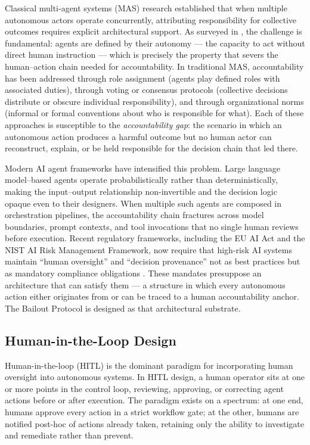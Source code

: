Classical multi-agent systems (MAS) research established that when multiple autonomous actors operate concurrently, attributing responsibility for collective outcomes requires explicit architectural support. As surveyed in \cite{trist1981}, the challenge is fundamental: agents are defined by their autonomy --- the capacity to act without direct human instruction --- which is precisely the property that severs the human--action chain needed for accountability. In traditional MAS, accountability has been addressed through role assignment (agents play defined roles with associated duties), through voting or consensus protocols (collective decisions distribute or obscure individual responsibility), and through organizational norms (informal or formal conventions about who is responsible for what). Each of these approaches is susceptible to the \textit{accountability gap}: the scenario in which an autonomous action produces a harmful outcome but no human actor can reconstruct, explain, or be held responsible for the decision chain that led there.

Modern AI agent frameworks have intensified this problem. Large language model--based agents operate probabilistically rather than deterministically, making the input--output relationship non-invertible and the decision logic opaque even to their designers. When multiple such agents are composed in orchestration pipelines, the accountability chain fractures across model boundaries, prompt contexts, and tool invocations that no single human reviews before execution. Recent regulatory frameworks, including the EU AI Act and the NIST AI Risk Management Framework, now require that high-risk AI systems maintain ``human oversight'' and ``decision provenance'' not as best practices but as mandatory compliance obligations \cite{trist1981}. These mandates presuppose an architecture that can satisfy them --- a structure in which every autonomous action either originates from or can be traced to a human accountability anchor. The Bailout Protocol is designed as that architectural substrate.

\subsection{Human-in-the-Loop Design}

Human-in-the-loop (HITL) is the dominant paradigm for incorporating human oversight into autonomous systems. In HITL design, a human operator sits at one or more points in the control loop, reviewing, approving, or correcting agent actions before or after execution. The paradigm exists on a spectrum: at one end, humans approve every action in a strict workflow gate; at the other, humans are notified post-hoc of actions already taken, retaining only the ability to investigate and remediate rather than prevent.

